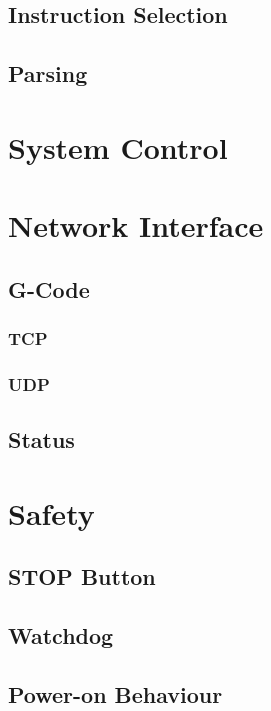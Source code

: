 		\subsection{Instruction Selection}
		
		\subsection{Parsing}
	
	\section{System Control}
	
	\section{Network Interface}
		
		\subsection{G-Code}
		
			\subsubsection{TCP}
			
			\subsubsection{UDP}
		
		\subsection{Status}
	
	\section{Safety}
		
		\subsection{STOP Button}
		
		\subsection{Watchdog}
		
		\subsection{Power-on Behaviour}
	
